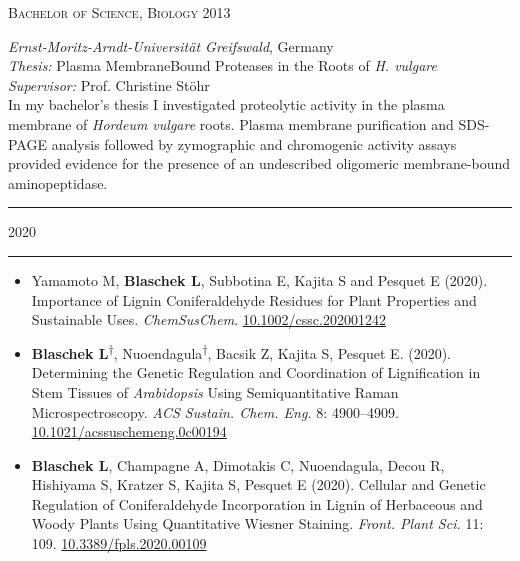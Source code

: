 \documentclass[11pt]{article}
\newcommand*{\xdash}[1][3em]{\rule[0.5ex]{#1}{0.55pt}}
\begin{document}
\textsc{\large{Bachelor of Science, Biology} \hfill \textsc{2013}}
\begin{addmargin}[24pt]{0pt}
	\textit{Ernst-Moritz-Arndt-Universität Greifswald}, Germany \\
	\textit{Thesis:} Plasma Membrane\textendash Bound Proteases in the Roots of \textit{H. vulgare}\\
	\textit{Supervisor:} Prof. Christine Stöhr
	\vspace{0.1cm} \\
	\small{In my bachelor's thesis I investigated proteolytic activity in the plasma membrane of \textit{Hordeum vulgare} roots. Plasma membrane purification and SDS-PAGE analysis followed by zymographic and chromogenic activity assays provided evidence for the presence of an undescribed oligomeric membrane-bound aminopeptidase.}
\end{addmargin}
\vspace{0.5cm}

\newpage


\hspace*{\fill} \xdash[6em] \large{\textsc{2020}} \xdash[6em] \hspace*{\fill} \normalsize

\vspace{-0.175cm}	
\begin{itemize}[label={},itemindent=-9pt,leftmargin=24pt]
	\itemsep-0.1cm
	\item Yamamoto M, \textbf{Blaschek L}, Subbotina E, Kajita S and Pesquet E (2020). Importance of Lignin Coniferaldehyde Residues for Plant Properties and Sustainable Uses. \textit{ChemSusChem}.
	\href{https://doi.org/10.1002/cssc.202001242}{10.1002/cssc.202001242}
	\item \textbf{Blaschek L}\textsuperscript{$\dagger$}, Nuoendagula\textsuperscript{$\dagger$}, Bacsik Z, Kajita S, Pesquet E. (2020). Determining the Genetic Regulation and Coordination of Lignification in Stem Tissues of \textit{Arabidopsis} Using Semiquantitative Raman Microspectroscopy. \textit{ACS Sustain. Chem. Eng.} 8: 4900--4909. \href{https://dx.doi.org/10.1021/acssuschemeng.0c00194}{10.1021/acssuschemeng.0c00194}
	\item \textbf{Blaschek L}, Champagne A, Dimotakis C, Nuoendagula, Decou R, Hishiyama S, Kratzer S, Kajita S, Pesquet E (2020). Cellular and Genetic Regulation of Coniferaldehyde Incorporation in Lignin of Herbaceous and Woody Plants Using Quantitative Wiesner Staining. \textit{Front. Plant Sci.} 11: 109. \href{https://doi.org/10.3389/fpls.2020.00109}{10.3389/fpls.2020.00109}
\end{itemize}
\end{document}
